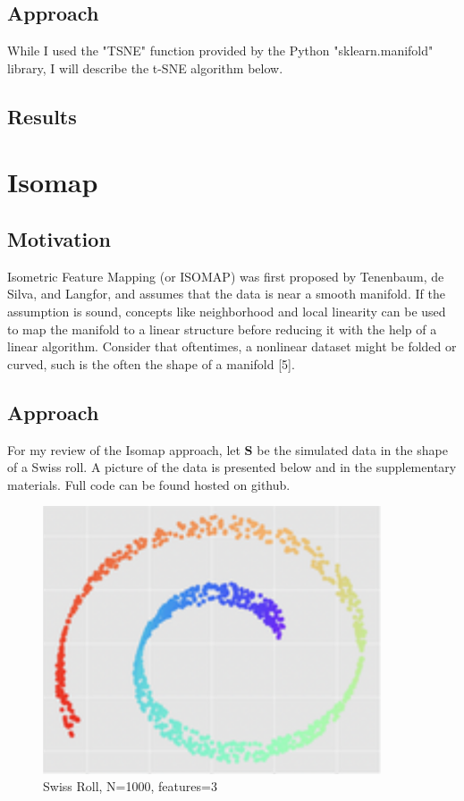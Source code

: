 \documentclass[12pt]{article}
\begin{document}
\subsection{Approach}
\hspace{5mm}While I used the "TSNE" function provided by the Python "sklearn.manifold" library, I will describe the t-SNE algorithm below.

\subsection{Results}

\section{Isomap} \label{sec: Isomap}


\subsection{Motivation}

\hspace{5mm}Isometric Feature Mapping (or ISOMAP) was first proposed by Tenenbaum, de Silva, and Langfor, and assumes that the data is near a smooth manifold. If the assumption is sound, concepts like neighborhood and local linearity can be used to map the manifold to a linear structure before reducing it with the help of a linear algorithm. Consider that oftentimes, a nonlinear dataset might be folded or curved, such is the often the shape of a manifold [5]. 


\subsection{Approach}
\hspace{5mm}For my review of the Isomap approach, let $\textbf{S}$ be the simulated data in the shape of a Swiss roll. A picture of the data is presented below and in the supplementary materials. Full code can be found hosted on github.

\begin{figure}[h!]
\centering    
\includegraphics[width=100mm]{swissroll1.png}
\caption{Swiss Roll, N=1000, features=3}
\label{fig: Swiss Roll}
\end{figure}
\end{document}
